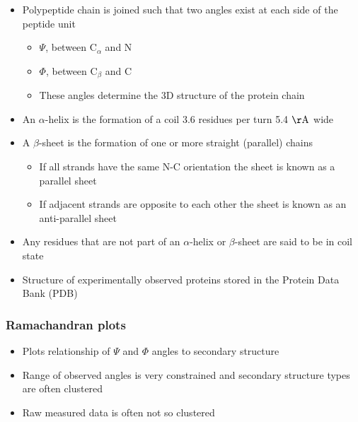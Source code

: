 \documentclass[a4paper]{article}
\begin{document}
\begin{itemize}
  \item
    Polypeptide chain is joined such that two angles exist at each side of the
    peptide unit

    \begin{itemize}
      \item
        $\Psi$, between $\mathrm{C}_{\alpha}$ and $\mathrm{N}$

      \item
        $\Phi$, between $\mathrm{C}_{\beta}$ and $\mathrm{C}$

      \item
        These angles determine the 3D structure of the protein chain
    \end{itemize}

  \item
    An $\alpha$-helix is the formation of a coil 3.6 residues per turn 5.4
    $\mathrm{\AA}$ wide

  \item
    A $\beta$-sheet is the formation of one or more straight (parallel) chains

    \begin{itemize}
      \item
        If all strands have the same N-C orientation the sheet is known as a
        parallel sheet

      \item
        If adjacent strands are opposite to each other the sheet is known as an
        anti-parallel sheet
    \end{itemize}

  \item
    Any residues that are not part of an $\alpha$-helix or $\beta$-sheet are
    said to be in coil state

  \item
    Structure of experimentally observed proteins stored in the Protein Data
    Bank (PDB)
\end{itemize}

\subsubsection{Ramachandran plots}

\begin{itemize}
  \item
    Plots relationship of $\Psi$ and $\Phi$ angles to secondary structure

  \item
    Range of observed angles is very constrained and secondary structure types
    are often clustered

  \item
    Raw measured data is often not so clustered
\end{itemize}
\end{document}
